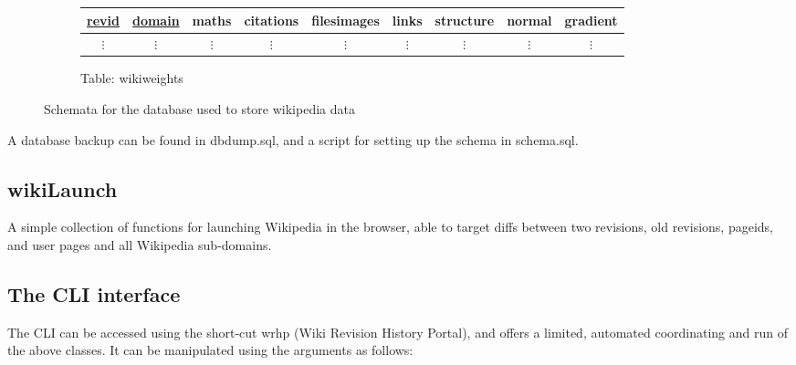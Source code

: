 \begin{figure}
\begin{subfigure}[b!]{\linewidth}
    \centering
    \begin{tabular}{ccccccccc}
      \toprule
      \underline{revid} & \underline{domain} & maths & citations & filesimages & links &
      structure & normal & gradient\\
      \midrule
      $\vdots$ & $\vdots$ & $\vdots$ & $\vdots$ & $\vdots$ & $\vdots$ &
      $\vdots$ & $\vdots$ & $\vdots$ \\
    \end{tabular}
    \caption{Table: wikiweights} 
  \end{subfigure}
  \caption{Schemata for the database used to store wikipedia data}
  \label{database-schema}
\end{figure}

A database backup can be found in dbdump.sql, and a script for setting
up the schema in schema.sql.

\clearpage

\subsection*{wikiLaunch}
A simple collection of functions for launching Wikipedia in the
browser, able to target diffs between two revisions, old revisions,
pageids, and user pages and all Wikipedia sub-domains.

\subsection*{The CLI interface}
The CLI can be accessed using the short-cut wrhp (Wiki Revision History
Portal), and offers a limited, automated coordinating and run of
the above classes. It can be manipulated using the arguments as follows:

